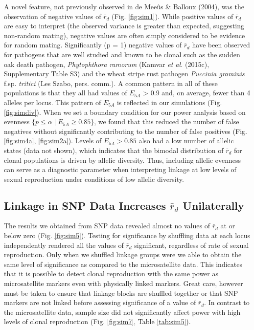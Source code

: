 \documentclass[]{article}
\theoremstyle{definition}
\theoremstyle{definition}
\theoremstyle{remark}
\begin{document}
A novel feature, not previously observed in de Meeûs \& Balloux (2004),
was the observation of negative values of \(\bar{r}_d\) (Fig.
\ref{fig:sim1}). While positive values of \(\bar{r}_d\) are easy to
interpret (the observed variance is greater than expected, suggesting
non-random mating), negative values are often simply considered to be
evidence for random mating. Significantly (p = 1) negative values of
\(\bar{r}_d\) have been observed for pathogens that are well studied and
known to be clonal such as the sudden oak death pathogen,
\emph{Phytophthora ramorum} (Kamvar \emph{et al.} (2015c), Supplementary
Table S3) and the wheat stripe rust pathogen \emph{Puccinia graminis}
f.sp. \emph{tritici} (Les Szabo, pers. comm.). A common pattern in all
of these populations is that they all had values of \(E_{5A}\)
\textgreater{} 0.9 and, on average, fewer than 4 alleles per locus. This
pattern of \(E_{5A}\) is reflected in our simulations (Fig.
\ref{fig:simdiv}). When we set a boundary condition for our power
analysis based on evenness \(\{p \leq \alpha \mid E_{5A} \geq 0.85\}\),
we found that this reduced the number of false negatives without
significantly contributing to the number of false positives (Fig.
\ref{fig:sim4a}, \ref{fig:sim2a}). Levels of \(E_{5A} > 0.85\) also had
a low number of allelic states (data not shown), which indicates that
the bimodal distribution of \(\bar{r}_d\) for clonal populations is
driven by allelic diversity. Thus, including allelic evenness can serve
as a diagnostic parameter when interpreting linkage at low levels of
sexual reproduction under conditions of low allelic diversity.

\subsection{\texorpdfstring{Linkage in SNP Data Increases \(\bar{r}_d\)
Unilaterally}{Linkage in SNP Data Increases \textbackslash{}bar\{r\}\_d Unilaterally}}\label{linkage-in-snp-data-increases-barr_d-unilaterally}

The results we obtained from SNP data revealed almost no values of
\(\bar{r}_d\) at or below zero (Fig. \ref{fig:sim5}). Testing for
significance by shuffling data at each locus independently rendered all
the values of \(\bar{r}_d\) significant, regardless of rate of sexual
reproduction. Only when we shuffled linkage groups were we able to
obtain the same level of significance as compared to the microsatellite
data. This indicates that it is possible to detect clonal reproduction
with the same power as microsatellite markers even with physically
linked markers. Great care, however must be taken to ensure that linkage
blocks are shuffled together or that SNP markers are not linked before
assessing significance of a value of \(\bar{r}_d\). In contrast to the
microsatellite data, sample size did not significantly affect power with
high levels of clonal reproduction (Fig. \ref{fig:sim7}, Table
\ref{tab:sim5}).
\end{document}
